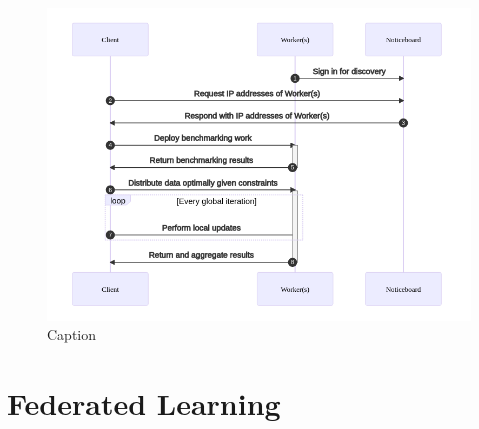 \documentclass[../mthe-493-final-project.tex]{subfiles}
\begin{document}
    \begin{figure}
        \centering
        \includegraphics{thesis/img/network-2.png}
        \caption{Caption}
        \label{fig:network-sequence}
    \end{figure}

    \section{Federated Learning}
    \label{sec:federate-learning}
\end{document}
